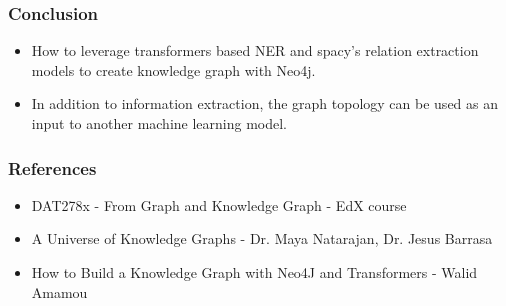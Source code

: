 \begin{frame}[fragile]\frametitle{Conclusion}

\begin{itemize}
\item How to leverage transformers based NER and spacy’s relation extraction models to create knowledge graph with Neo4j.
\item In addition to information extraction, the graph topology can be used as an input to another machine learning model. 
\end{itemize}
	  
\end{frame}






\begin{frame}[fragile]\frametitle{References}

\begin{itemize}
\item DAT278x - From Graph and Knowledge Graph - EdX course
\item A Universe of Knowledge Graphs -  Dr. Maya Natarajan, Dr. Jesus Barrasa
\item How to Build a Knowledge Graph with Neo4J and Transformers - Walid Amamou
\end{itemize}
	  
\end{frame}







